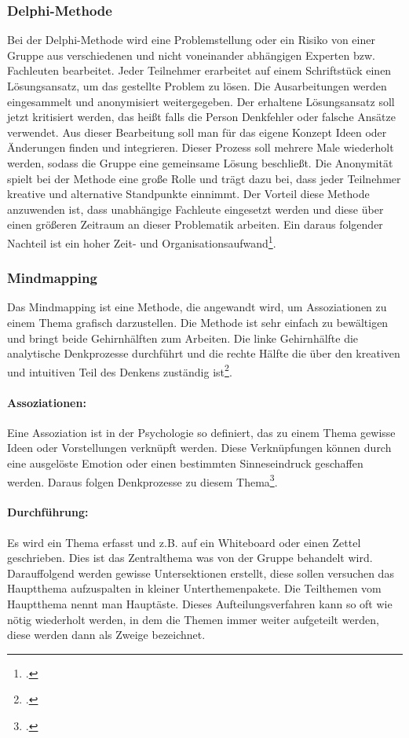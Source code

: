 \subsubsection{Delphi-Methode}
Bei der Delphi-Methode wird eine Problemstellung oder ein Risiko von einer Gruppe aus verschiedenen und nicht voneinander abhängigen Experten bzw. Fachleuten bearbeitet. 
Jeder Teilnehmer erarbeitet auf einem Schriftstück einen Lösungsansatz, um das gestellte Problem zu lösen.
Die Ausarbeitungen werden eingesammelt und anonymisiert weitergegeben.
Der erhaltene Lösungsansatz soll jetzt kritisiert werden, das heißt falls die Person Denkfehler oder falsche Ansätze verwendet. Aus dieser Bearbeitung soll man für das eigene Konzept Ideen oder Änderungen finden und integrieren.
Dieser Prozess soll mehrere Male wiederholt werden, sodass die Gruppe eine gemeinsame Lösung beschließt.
Die Anonymität spielt bei der Methode eine große Rolle und trägt dazu bei, dass jeder Teilnehmer kreative und alternative Standpunkte einnimmt.
Der Vorteil diese Methode anzuwenden ist, dass unabhängige Fachleute eingesetzt werden und diese über einen größeren Zeitraum an dieser Problematik arbeiten.
Ein daraus folgender Nachteil ist ein hoher Zeit- und Organisationsaufwand\footcite{risikomanagement-diplomarbeit-methoden}.

\subsubsection{Mindmapping}
Das Mindmapping ist eine Methode, die angewandt wird, um Assoziationen zu einem Thema grafisch darzustellen.
Die Methode ist sehr einfach zu bewältigen und bringt beide Gehirnhälften zum Arbeiten. Die linke Gehirnhälfte die analytische Denkprozesse durchführt und die rechte Hälfte die über den kreativen und intuitiven Teil des Denkens zuständig ist\footcite{risikomanagement-diplomarbeit-methoden}.

\paragraph{Assoziationen:} 
Eine Assoziation ist in der Psychologie so definiert, das zu einem Thema gewisse Ideen oder Vorstellungen verknüpft werden. Diese Verknüpfungen können durch eine ausgelöste Emotion oder einen bestimmten Sinneseindruck geschaffen werden. Daraus folgen Denkprozesse zu diesem Thema\footcite{assoziationen}. 

\paragraph{Durchführung:}
Es wird ein Thema erfasst und z.B. auf ein Whiteboard oder einen Zettel geschrieben. Dies ist das Zentralthema was von der Gruppe behandelt wird.
Darauffolgend werden gewisse Untersektionen erstellt, diese sollen versuchen das Hauptthema aufzuspalten in kleiner Unterthemenpakete.
Die Teilthemen vom Hauptthema nennt man Hauptäste.
Dieses Aufteilungsverfahren kann so oft wie nötig wiederholt werden, in dem die Themen immer weiter aufgeteilt werden, diese werden dann als Zweige bezeichnet.

